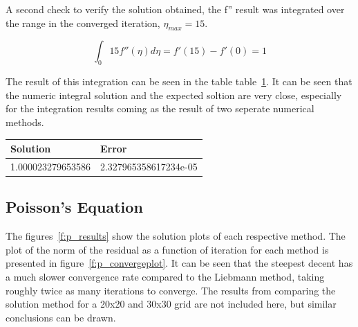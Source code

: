 \documentclass[]{aiaa-tc}%
\begin{document}
\begin{figure}[htb]
\begin{subfigmatrix}{2}
  \end{subfigmatrix}
 \label{f:blas_plots}
\end{figure}

A second check to verify the solution obtained, the f'' result was integrated over
the range in the converged iteration, $\eta_{max} = 15$.

$$
  \int_{0}{15} f''(\eta) d\eta = f'(15) - f'(0) = 1
$$

The result of this integration can be seen in the table table~\ref{t:blas_interror}.
It can be seen that the numeric integral solution and the expected soltion are very close,
especially for the integration results coming as the result of two seperate numerical methods.

\begin{table}
\centering
\label{t:blas_interror}
  \begin{tabular}{l | l}
  Solution & Error \\
  \hline
  1.000023279653586 & 2.327965358617234e-05 \\
  \end{tabular}
\end{table}

\FloatBarrier\subsection{Poisson's Equation}

The figures~\ref{f:p_results} show the solution plots of each respective method.
The plot of the norm of the residual as a function of iteration for each method
is presented in figure~\ref{f:p_convergeplot}. It can be seen that the steepest decent
has a much slower convergence rate compared to the Liebmann method, taking roughly
twice as many iterations to converge. The results from comparing the solution method
for a 20x20 and 30x30 grid are not included here, but similar conclusions can be drawn. 
\end{document}
